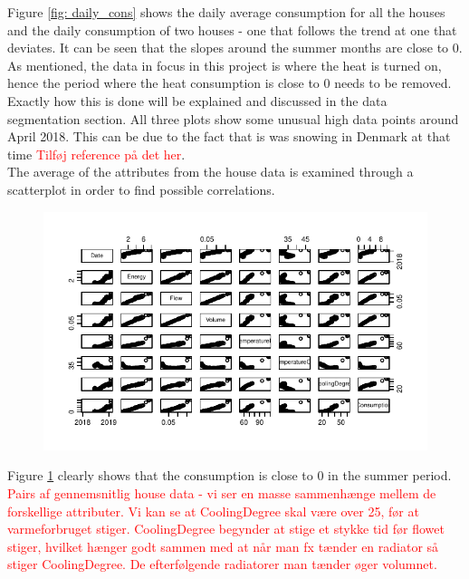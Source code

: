 \noindent Figure \ref{fig: daily_cons} shows the daily average consumption for all the houses and the daily consumption of two houses - one that follows the trend at one that deviates. It can be seen that the slopes around the summer months are close to 0. As mentioned, the data in focus in this project is where the heat is turned on, hence the period where the heat consumption is close to 0 needs to be removed. Exactly how this is done will be explained and discussed in the data segmentation section. All three plots show some unusual high data points around April 2018. This can be due to the fact that is was snowing in Denmark at that time \textcolor{red}{Tilføj reference på det her}. 
\newline \\
\noindent The average of the attributes from the house data is examined through a scatterplot in order to find possible correlations.
\begin{figure}
    \centering
    \includegraphics[width=.75\textwidth]{../../../figures/house_attri.pdf}
    \caption{}
    \label{fig: house_attri}
\end{figure}
\noindent Figure \ref{fig: house_attri} clearly shows that the consumption is close to 0 in the summer period.  
\textcolor{red}{Pairs af gennemsnitlig house data - vi ser en masse sammenhænge mellem de forskellige attributer. Vi kan se at CoolingDegree skal være over 25, før at varmeforbruget stiger.}
\textcolor{red}{CoolingDegree begynder at stige et stykke tid før flowet stiger, hvilket hænger godt sammen med at når man fx tænder en radiator så stiger CoolingDegree. De efterfølgende radiatorer man tænder øger volumnet.} \\

